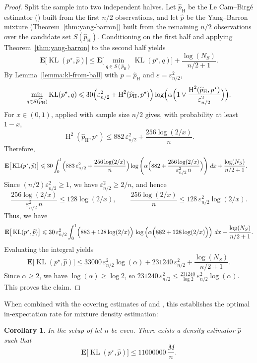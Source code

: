 \documentclass[11pt]{article}
\newcommand{\E}{{\mathbf E}}
\renewcommand{\le}{\leqslant}
\renewcommand{\ge}{\geqslant}
\newcommand{\eps}{\varepsilon}
\newcommand{\kl}{\operatorname{KL}}
\newcommand{\hel}{\operatorname{H}}
\newcommand{\hels}{\hel^2}
\newtheorem{corollary}{Corollary}
\theoremstyle{definition}
\theoremstyle{remark}
\begin{document}
\begin{proof}
Split the sample into two independent halves.
Let $\widehat{p}_{\hel}$ be the Le Cam--Birg\'e estimator () built from the first $n/2$ observations, and let $\widehat{p}$ be the Yang--Barron mixture (Theorem~\ref{thm:yang-barron}) built from the remaining $n/2$ observations over the candidate set $S(\widehat{p}_{\hel})$.
Conditioning on the first half and applying Theorem~\ref{thm:yang-barron} to the second half yields
\[
\E\big[\kl(p^\star,\widehat{p})\big]
\le
\E\Big[\min_{q\in S(\widehat{p}_{\hel})}\kl(p^\star,q)\Big]
+\frac{\log(N_S)}{n/2+1}.
\]
By Lemma~\ref{lemma:kl-from-ball} with $p=\widehat{p}_{\hel}$ and $\eps=\eps_{n/2}^2$,
\[
\min_{q\in S(\widehat{p}_{\hel})}\kl(p^\star,q)
\le
30\Bigl(\eps_{n/2}^2+\hels(\widehat{p}_{\hel},p^\star)\Bigr)
\log\Bigl(\alpha\Bigl(1\vee \frac{\hels(\widehat{p}_{\hel},p^\star)}{\eps_{n/2}^2}\Bigr)\Bigr).
\]
For $x\in(0,1)$,  applied with sample size $n/2$ gives, with probability at least $1-x$,
\[
\hels(\widehat{p}_{\hel},p^\star)
\le
882\,\eps_{n/2}^2+\frac{256\log(2/x)}{n}.
\]
Therefore,
\begin{align*}
\E\big[\kl(p^\star,\widehat{p})\big]
&\le
30 \int_0^1
\Bigl(883\,\eps_{n/2}^2+\frac{256\log(2/x)}{n}\Bigr)
\log\left(\alpha\Bigl(882+\frac{256\log(2/x)}{\eps_{n/2}^2\,n}\Bigr)\right)\,dx
+\frac{\log(N_S)}{n/2+1}.
\end{align*}
Since $(n/2)\eps_{n/2}^2\ge 1$, we have $\eps_{n/2}^2\ge 2/n$, and hence
\[
\frac{256\log(2/x)}{\eps_{n/2}^2\,n}\le 128\log(2/x),
\qquad
\frac{256\log(2/x)}{n}\le 128\,\eps_{n/2}^2\log(2/x).
\]
Thus, we have
\[
\E\big[\kl(p^\star,\widehat{p})\big]
\le
30\,\eps_{n/2}^2\int_0^1\Bigl(883+128\log(2/x)\Bigr)\,
\log\left(\alpha\Bigl(882+128\log(2/x)\Bigr)\right)\,dx
+\frac{\log(N_S)}{n/2+1}.
\]
Evaluating the integral yields
\[
\E\big[\kl(p^\star,\widehat{p})\big]
\le
33000\,\eps_{n/2}^2\log(\alpha)+231240\,\eps_{n/2}^2+\frac{\log(N_S)}{n/2+1}.
\]
Since $\alpha\ge 2$, we have $\log(\alpha)\ge \log 2$, so
$231240\,\eps_{n/2}^2 \le \frac{231240}{\log 2}\,\eps_{n/2}^2\log(\alpha)$.
This proves the claim.\qedhere
\end{proof}

When combined with the covering estimates of  and , this establishes the optimal in-expectation rate for mixture density estimation:

\begin{corollary}\label{cor:expected-mix}
In the setup of  let $n$ be even.
There exists a density estimator $\widehat{p}$ such that
\[
\E\big[\kl(p^\star,\widehat{p})\big]
\le
11000000 \, \frac{M}{n}.
\]
\end{corollary}
\end{document}
